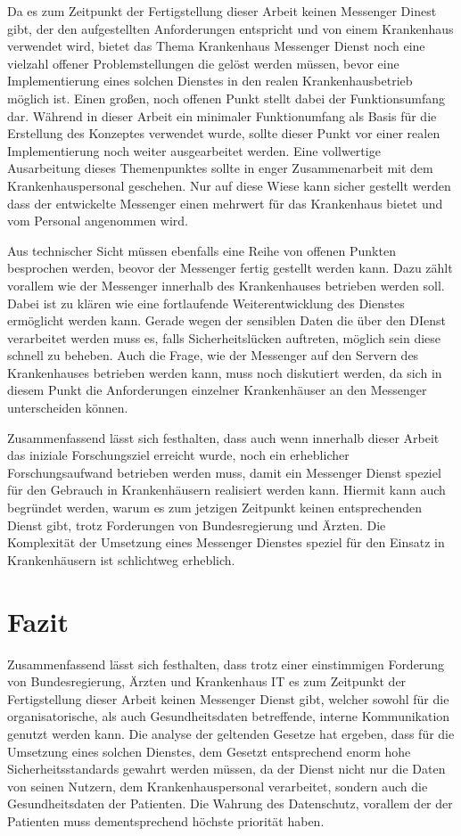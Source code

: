 Da es zum Zeitpunkt der Fertigstellung dieser Arbeit keinen Messenger Dinest gibt, der den aufgestellten Anforderungen entspricht und von einem Krankenhaus verwendet wird, bietet das Thema Krankenhaus Messenger Dienst noch eine vielzahl offener Problemstellungen die gelöst werden müssen, bevor eine Implementierung eines solchen Dienstes in den realen Krankenhausbetrieb möglich ist.
Einen großen, noch offenen Punkt stellt dabei der Funktionsumfang dar. Während in dieser Arbeit ein minimaler Funktionumfang als Basis für die Erstellung des Konzeptes verwendet wurde, sollte dieser Punkt vor einer realen Implementierung noch weiter ausgearbeitet werden. Eine vollwertige Ausarbeitung dieses Themenpunktes sollte in enger Zusammenarbeit mit dem Krankenhauspersonal geschehen. Nur auf diese Wiese kann sicher gestellt werden dass der entwickelte Messenger einen mehrwert für das Krankenhaus bietet und vom Personal angenommen wird.

Aus technischer Sicht müssen ebenfalls eine Reihe von offenen Punkten besprochen werden, beovor der Messenger fertig gestellt werden kann.
Dazu zählt vorallem wie der Messenger innerhalb des Krankenhauses betrieben werden soll. Dabei ist zu klären wie eine fortlaufende Weiterentwicklung des Dienstes ermöglicht werden kann. Gerade wegen der sensiblen Daten die über den DIenst verarbeitet werden muss es, falls Sicherheitslücken auftreten, möglich sein diese schnell zu beheben. Auch die Frage, wie der Messenger auf den Servern des Krankenhauses betrieben werden kann, muss noch diskutiert werden, da sich in diesem Punkt die Anforderungen einzelner Krankenhäuser an den Messenger unterscheiden können.

Zusammenfassend lässt sich festhalten, dass auch wenn innerhalb dieser Arbeit das iniziale Forschungsziel erreicht wurde, noch ein erheblicher Forschungsaufwand betrieben werden muss, damit ein Messenger Dienst speziel für den Gebrauch in Krankenhäusern realisiert werden kann. Hiermit kann auch begründet werden, warum es zum jetzigen Zeitpunkt keinen entsprechenden Dienst gibt, trotz Forderungen von Bundesregierung und Ärzten. Die Komplexität der Umsetzung eines Messenger Dienstes speziel für den Einsatz in Krankenhäusern ist schlichtweg erheblich.

\section{Fazit}\label{chapter:fazit}
Zusammenfassend lässt sich festhalten, dass trotz einer einstimmigen Forderung von Bundesregierung, Ärzten und Krankenhaus IT es zum Zeitpunkt der Fertigstellung dieser Arbeit keinen Messenger Dienst gibt, welcher sowohl für die organisatorische, als auch Gesundheitsdaten betreffende, interne Kommunikation genutzt werden kann. Die analyse der geltenden Gesetze hat ergeben, dass für die Umsetzung eines solchen Dienstes, dem Gesetzt entsprechend enorm hohe Sicherheitsstandards gewahrt werden müssen, da der Dienst nicht nur die Daten von seinen Nutzern, dem Krankenhauspersonal verarbeitet, sondern auch die Gesundheitsdaten der Patienten. Die Wahrung des Datenschutz, vorallem der der Patienten muss dementsprechend höchste priorität haben. 


